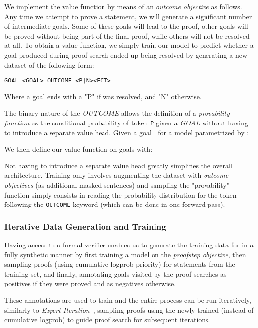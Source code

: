 \documentclass{article}
\begin{document}
We implement the value function by means of an \textit{outcome objective} as follows. Any time we attempt to prove a statement, we will generate a significant number of intermediate goals. Some of these goals will lead to the proof, other goals will be proved without being part of the final proof, while others will not be resolved at all. To obtain a value function, we simply train our model to predict whether a goal produced during proof search ended up being resolved by generating a new dataset of the following form:  

\begin{verbatim}
GOAL <GOAL> OUTCOME <P|N><EOT>
\end{verbatim}

Where a goal ends with a "P" if was resolved, and "N" otherwise.

The binary nature of the \textit{OUTCOME} allows the definition of a \textit{provability function}  as the conditional probability of token \verb|P| given a \textit{GOAL} without having to introduce a separate value head. Given a goal , for a model parametrized by :



We then define our value function  on goals with:



Not having to introduce a separate value head greatly simplifies the overall architecture. Training only involves augmenting the dataset with \textit{outcome objectives} (as additional masked sentences) and sampling the "provability" function simply consists in reading the probability distribution for the token following the \verb|OUTCOME| keyword (which can be done in one forward pass).

\subsubsection{Iterative Data Generation and Training}

Having access to a formal verifier enables us to generate the training data for  in a fully synthetic manner by first training a model on the \textit{proofstep objective}, then sampling proofs (using cumulative logprob priority) for statements from the training set, and finally, annotating goals visited by the proof searches as positives if they were proved and as negatives otherwise.

These annotations are used to train  and the entire process can be run iteratively, similarly to \textit{Expert Iteration}~\cite{anthony2017thinking}, sampling proofs using the newly trained  (instead of cumulative logprob) to guide proof search for subsequent iterations.
\end{document}
